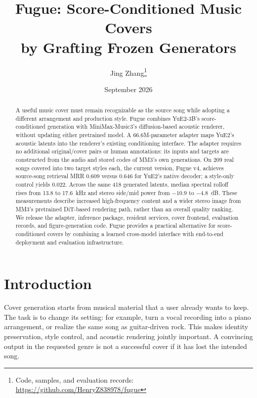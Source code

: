 \documentclass[11pt,a4paper]{article}
\title{%
  \textbf{Fugue}: Score-Conditioned Music Covers\\
  by Grafting Frozen Generators%
}
\author[1]{Jing Zhang\thanks{Code, samples, and evaluation records: \url{https://github.com/HenryZ838978/fugue}}}
\affil[1]{Independent Research}
\date{September 2026}
\begin{document}
\maketitle

\begin{abstract}
\noindent
A useful music cover must remain recognizable as the source song while adopting a different arrangement and production style. Fugue combines YuE2-3B's score-conditioned generation with MiniMax-Music3's diffusion-based acoustic renderer, without updating either pretrained model. A 66.6M-parameter adapter maps YuE2's acoustic latents into the renderer's existing conditioning interface. The adapter requires no additional original/cover pairs or human annotations: its inputs and targets are constructed from the audio and stored codes of MM3's own generations. On 209 real songs covered into two target styles each, the current version, Fugue v4, achieves source-song retrieval MRR 0.609 versus 0.646 for YuE2's native decoder; a style-only control yields 0.022. Across the same 418 generated latents, median spectral rolloff rises from 13.8 to 17.6~kHz and stereo side/mid power from $-10.9$ to $-4.8$~dB. These measurements describe increased high-frequency content and a wider stereo image from MM3's pretrained DiT-based rendering path, rather than an overall quality ranking. We release the adapter, inference package, resident services, cover frontend, evaluation records, and figure-generation code. Fugue provides a practical alternative for score-conditioned covers by combining a learned cross-model interface with end-to-end deployment and evaluation infrastructure.
\end{abstract}

\section{Introduction}

Cover generation starts from musical material that a user already wants to keep. The task is to change its setting: for example, turn a vocal recording into a piano arrangement, or realize the same song as guitar-driven rock. This makes identity preservation, style control, and acoustic rendering jointly important. A convincing output in the requested genre is not a successful cover if it has lost the intended song.
\end{document}
